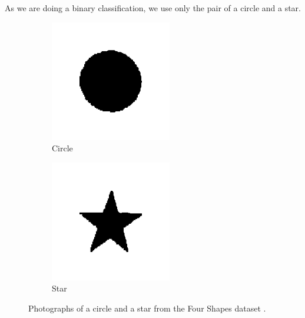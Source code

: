 As we are doing a binary classification, we use only the pair of a circle and a star.
\begin{figure}[ht]
    \centering
    \begin{subfigure}[t]{0.2\textwidth}
        \includegraphics[width=\textwidth]{Figures/datasets/circle.png}
        \caption{Circle}
    \end{subfigure}
    \begin{subfigure}[t]{0.2\textwidth}
        \includegraphics[width=\textwidth]{Figures/datasets/star.png}
        \caption{Star}
    \end{subfigure}
    \caption[Photographs of a circle and a star from the Four Shapes dataset]{Photographs of a circle and a star from the Four Shapes dataset \cite{kaggleFourShapes}.}
    \label{fig:four_shapes}
\end{figure}

